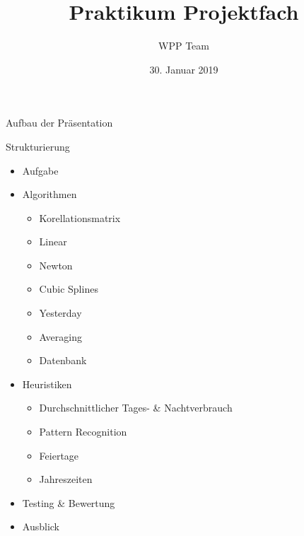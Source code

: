 \documentclass{beamer}           %
\title[WPP]{Praktikum Projektfach}
\author[Team]{WPP Team}
\institute{Hochschule Niederrhein - Fachbereich Elektrotechnik \& Informatik}
\date{30. Januar 2019}
\begin{document}
\frame[plain]{\titlepage}

\begin{frame}{Aufbau der Präsentation}
\tableofcontents  
\end{frame}

\begin{frame}{Strukturierung}
	\begin{itemize}
		\item Aufgabe %
		\item Algorithmen %
		\begin{itemize}
			\item Korellationsmatrix %
			\item Linear %
			\item Newton %
			\item Cubic Splines %
			\item Yesterday %
			\item Averaging %
			\item Datenbank %
		\end{itemize}
		\item Heuristiken %
		\begin{itemize}
			\item Durchschnittlicher Tages- \& Nachtverbrauch %
			\item Pattern Recognition %
			\item Feiertage %
			\item Jahreszeiten %
		\end{itemize}
		\item Testing \& Bewertung %
		\item Ausblick %
	\end{itemize}
\end{frame}



\begin{frame}{}
\fontsize{24pt}{12pt}\selectfont
{}
\end{frame}
\end{document}
